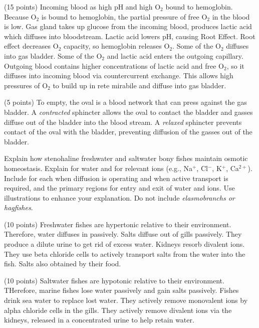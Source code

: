 \documentclass[11pt, addpoints]{exam}
\begin{document}
\begin{questions}
\begin{solution}
(15 points) Incoming blood as high pH and high O$_2$ bound to hemoglobin. Because O$_2$ is bound to hemoglobin, the partial pressure of free O$_2$ in the blood is low. Gas gland takes up glucose from the incoming blood, produces lactic acid which diffuses into bloodstream. Lactic acid lowers pH, causing Root Effect. Root effect decreases O$_2$ capacity, so hemoglobin releases O$_2$. Some of the O$_2$ diffuses into gas bladder. Some of the O$_2$ and lactic acid enters the outgoing capillary. Outgoing blood contains higher concentrations of lactic acid and free O$_2$, so it diffuses into incoming blood via countercurrent exchange. This allows high pressures of O$_2$ to build up in rete mirabile and diffuse into gas bladder.

(5 points) To empty, the oval is a blood network that can press against the gas bladder. A \emph{contracted} sphincter allows the oval to contact the bladder and gasses diffuse out of the bladder into the blood stream. A \emph{relaxed} sphincter prevents contact of the oval with the bladder, preventing diffusion of the gasses out of the bladder.
\end{solution}

\newpage

\question[15]
Explain how stenohaline freshwater and saltwater bony fishes maintain osmotic homeostasis.  Explain for water and for relevant ions (e.g., Na$^+$, Cl$^-$, K$^+$, Ca$^{2+}$).  Include for each when diffusion is operating and when active transport is required, and the primary regions for entry and exit of water and ions.  Use illustrations to enhance your explanation.  Do not include \emph{elasmobranchs or hagfishes}.

\begin{solution}
(10 points) Freshwater fishes are hypertonic relative to their environment. Therefore, water diffuses in passively. Salts diffuse out of gills passively. They produce a dilute urine to get rid of excess water. Kidneys resorb divalent ions. They use beta chloride cells to actively transport salts from the water into the fish. Salts also obtained by their food. 

(10 points) Saltwater fishes are hypotonic relative to their environment. THerefore, marine fishes lose water passively and gain salts passively. Fishes drink sea water to replace lost water. They actively remove monovalent ions by alpha chloride cells in the gills. They actively remove divalent ions via the kidneys, released in a concentrated urine to help retain water.
\end{solution}


\end{questions}
\end{document}
